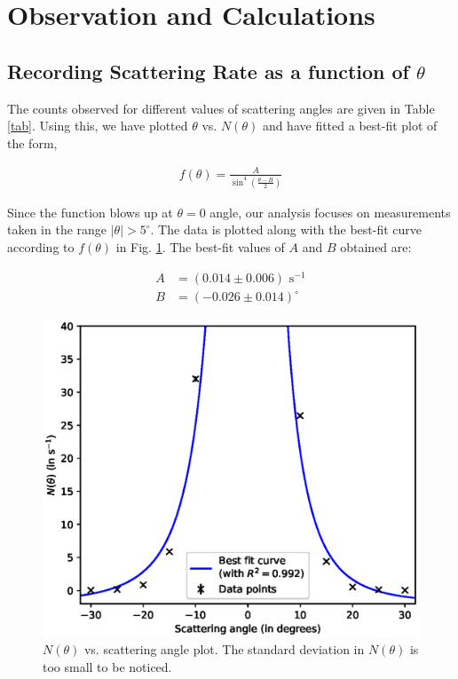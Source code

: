 \section{Observation and Calculations}

\subsection{Recording Scattering Rate as a function of $\theta$}

The counts observed for different values of scattering angles are given in Table \ref{tab}. Using this, we have plotted $\theta$ vs. $N(\theta)$ and have fitted a best-fit plot of the form,

\begin{align} \label{eq:gen}
    f(\theta) = \frac{A}{\sin^4\left(\frac{\theta-B}{2}\right)}
\end{align}

Since the function blows up at $\theta=0$ angle, our analysis focuses on measurements taken in the range $|\theta| > 5^\circ$. The data is plotted along with the best-fit curve according to $f(\theta)$ in Fig. \ref{plot}. The best-fit values of $A$ and $B$ obtained are:

\begin{align*}
    A &= (0.014 \pm 0.006) \text{ s}^{-1}\\
    B &= (-0.026 \pm 0.014)^\circ
\end{align*}

\begin{figure}
    \centering
    \includegraphics[width=1\columnwidth]{images/plt.eps}
    \caption{$N(\theta)$ vs. scattering angle plot. The standard deviation in $N(\theta)$ is too small to be noticed.}
    \label{plot}
\end{figure}

